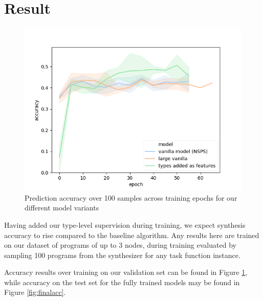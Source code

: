 \documentclass{article} %
\begin{document}

\vspace{-10pt}
\section{Result} \label{sec:result}
\vspace{-10pt}

\begin{figure}
    \vspace{-20pt}
    \includegraphics[scale=0.5]{figures/experiments.png}
    \vspace{-20pt}
    \caption{
        Prediction accuracy over 100 samples across training epochs for our different model variants
    }
    \label{fig:accuracy}
    \vspace{-70pt}
\end{figure}

Having added our type-level supervision during training, we expect synthesis accuracy to rise compared to the baseline algorithm.
%
Any results here are trained on our dataset of programs of up to 3 nodes,
during training evaluated by sampling 100 programs from the synthesizer for any task function instance.

Accuracy results over training on our validation set can be found in Figure \ref{fig:accuracy},
while accuracy on the test set for the fully trained models may be found in Figure \ref{fig:finalacc}.
\end{document}
